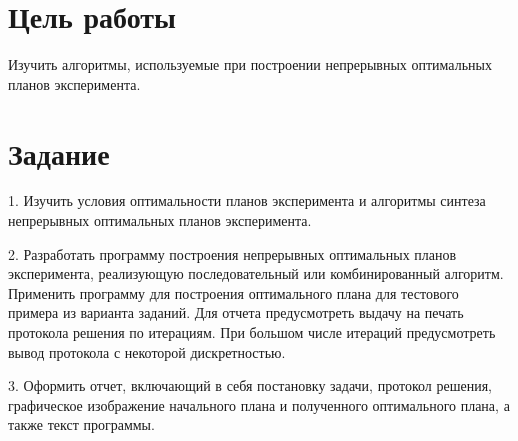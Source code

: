 ﻿%

\newcommand{\insertFourImages}[4]
{
	\begin{figure}[!htb] %
		\centering
		\texttt{[image: \#1]}
		\texttt{[image: \#2]}
		\texttt{[image: \#3]}
		\texttt{[image: \#4]}
	\end{figure}
}





\section{Цель работы}
Изучить алгоритмы, используемые при построении непрерывных оптимальных планов эксперимента.


\section{Задание}

1.	Изучить условия оптимальности планов эксперимента и алгоритмы синтеза непрерывных оптимальных планов эксперимента.

2.	Разработать программу построения непрерывных оптимальных планов эксперимента, реализующую последовательный или комбинированный алгоритм. Применить программу для построения оптимального плана для тестового примера из варианта заданий. Для отчета предусмотреть выдачу на печать протокола решения по итерациям. При большом числе итераций предусмотреть вывод протокола с некоторой дискретностью.

3.	Оформить отчет, включающий в себя постановку задачи, протокол решения, графическое изображение начального плана и полученного оптимального плана, а также текст программы.

